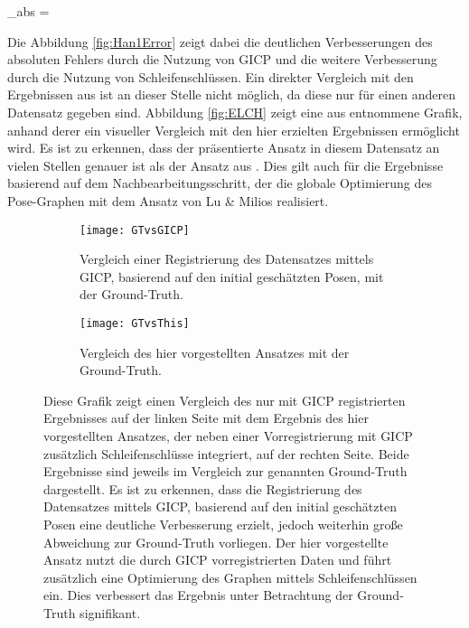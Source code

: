 \begin{myequation}
\varepsilon_{abs} = 
\end{myequation}

Die Abbildung \ref{fig:Han1Error} zeigt dabei die deutlichen Verbesserungen des absoluten Fehlers durch die Nutzung von GICP und die weitere Verbesserung durch die Nutzung von Schleifenschlüssen. Ein direkter Vergleich mit den Ergebnissen aus \cite{sprickerhof2011heuristic} ist an dieser Stelle nicht möglich, da diese nur für einen anderen Datensatz gegeben sind. Abbildung \ref{fig:ELCH} zeigt eine aus \cite{sprickerhof2011heuristic} entnommene Grafik, anhand derer ein visueller Vergleich mit den hier erzielten Ergebnissen ermöglicht wird. Es ist zu erkennen, dass der präsentierte Ansatz in diesem Datensatz an vielen Stellen genauer ist als der Ansatz aus \cite{sprickerhof2011heuristic}. Dies gilt auch für die Ergebnisse  basierend auf dem Nachbearbeitungsschritt, der die globale Optimierung des Pose-Graphen mit dem Ansatz von Lu \& Milios \cite{lu1997globally} realisiert.

\begin{figure}
	\centering
	\begin{subfigure}{.5\textwidth}
		 \centering
  		 \texttt{[image: GTvsGICP]}
  		 \centering \caption{Vergleich einer Registrierung des Datensatzes mittels GICP, basierend auf den initial geschätzten Posen, mit der Ground-Truth.}
  		 \label{fig:Han1Initial}
	\end{subfigure}%
	\begin{subfigure}{.5\textwidth}
    	\centering
  		\texttt{[image: GTvsThis]}
  		\centering \caption{Vergleich des hier vorgestellten Ansatzes mit der Ground-Truth.}
  		\label{fig:Han1GT}
	\end{subfigure}
	\caption{Diese Grafik zeigt einen Vergleich des nur mit GICP registrierten Ergebnisses auf der linken Seite mit dem Ergebnis des hier vorgestellten Ansatzes, der neben einer Vorregistrierung mit GICP zusätzlich Schleifenschlüsse integriert, auf der rechten Seite. Beide Ergebnisse sind jeweils im Vergleich zur genannten Ground-Truth dargestellt. Es ist zu erkennen, dass die Registrierung des Datensatzes mittels GICP, basierend auf den initial geschätzten Posen eine deutliche Verbesserung erzielt, jedoch weiterhin große Abweichung zur Ground-Truth vorliegen. Der hier vorgestellte Ansatz nutzt die durch GICP vorregistrierten Daten und führt zusätzlich eine Optimierung des Graphen mittels Schleifenschlüssen ein. Dies verbessert das Ergebnis unter Betrachtung der Ground-Truth signifikant.}
	\label{fig:Han1This}
\end{figure}


